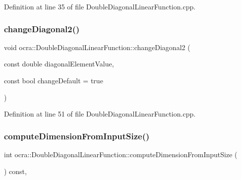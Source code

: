 Definition at line 35 of file Double\+Diagonal\+Linear\+Function.\+cpp.

\hypertarget{classocra_1_1DoubleDiagonalLinearFunction_a1a9ec0f7bb11ae2f1ddd6dffceea8921}{}\label{classocra_1_1DoubleDiagonalLinearFunction_a1a9ec0f7bb11ae2f1ddd6dffceea8921} 
\subsubsection{\texorpdfstring{change\+Diagonal2()}{changeDiagonal2()}\hspace{0.1cm}{\footnotesize\ttfamily [2/2]}}
{\footnotesize\ttfamily void ocra\+::\+Double\+Diagonal\+Linear\+Function\+::change\+Diagonal2 (\begin{DoxyParamCaption}\item[{const double}]{diagonal\+Element\+Value,  }\item[{const bool}]{change\+Default = {\ttfamily true} }\end{DoxyParamCaption})\hspace{0.3cm}{\ttfamily [virtual]}}



Definition at line 51 of file Double\+Diagonal\+Linear\+Function.\+cpp.

\hypertarget{classocra_1_1DoubleDiagonalLinearFunction_af449f5bb219672d4f316a0d626436ec8}{}\label{classocra_1_1DoubleDiagonalLinearFunction_af449f5bb219672d4f316a0d626436ec8} 
\subsubsection{\texorpdfstring{compute\+Dimension\+From\+Input\+Size()}{computeDimensionFromInputSize()}}
{\footnotesize\ttfamily int ocra\+::\+Double\+Diagonal\+Linear\+Function\+::compute\+Dimension\+From\+Input\+Size (\begin{DoxyParamCaption}{ }\end{DoxyParamCaption}) const\hspace{0.3cm}{\ttfamily [protected]}, {\ttfamily [virtual]}}

